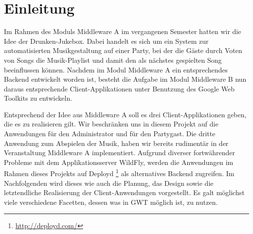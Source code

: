 \section{Einleitung}
Im Rahmen des Moduls Middleware A im vergangenen Semester hatten wir die Idee der Drunken-Jukebox. Dabei handelt es sich um ein System zur automatisierten Musikgestaltung auf einer Party, bei der die Gäste durch Voten von Songs die Musik-Playlist und damit den als nächstes gespielten Song beeinflussen können. Nachdem im Modul Middleware A ein entsprechendes Backend entwickelt worden ist, besteht die Aufgabe im Modul Middleware B nun daraus entsprechende Client-Applikationen unter Benutzung des Google Web Toolkits zu entwickeln. 

Entsprechend der Idee aus Middleware A soll es drei Client-Applikationen geben, die es zu realisieren gilt. Wir beschränken uns in diesem Projekt auf die Anwendungen für den Administrator und für den Partygast. Die dritte Anwendung zum Abspielen der Musik, haben wir bereits rudimentär in der Veranstaltung Middleware A implementiert. Aufgrund diverser fortwährender Probleme mit dem Applikationsserver WildFly, werden die Anwendungen im Rahmen dieses Projekts auf Deployd \footnote{\url{http://deployd.com/}} als alternatives Backend zugreifen. Im Nachfolgenden wird dieses wie auch die Planung, das Design sowie die letztendliche Realisierung der Client-Anwendungen vorgestellt. Es galt möglichst viele verschiedene Facetten, dessen was in GWT möglich ist, zu nutzen.
